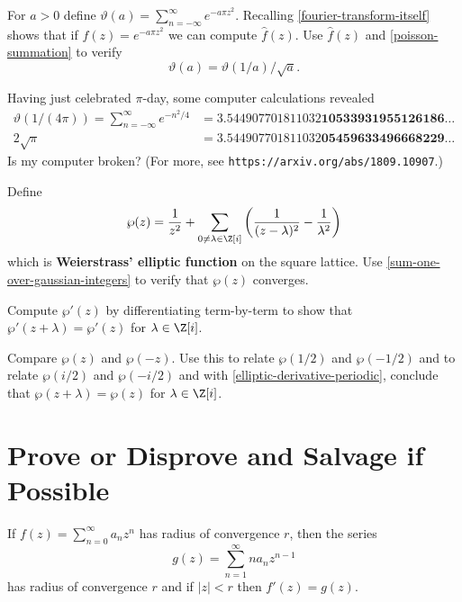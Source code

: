 \documentclass{homework}
\begin{document}
\begin{problem}\label{modularity}For $a > 0$ define
  $\vartheta(a) = \sum_{n=-\infty}^\infty e^{-a \pi z^2}$.  Recalling
  \ref{fourier-transform-itself} shows that if $f(z) = e^{-a \pi z^2}$
  we can compute $\hat{f}(z)$.  Use $\hat{f}(z)$ and
  \ref{poisson-summation} to verify
  \[
    \vartheta(a) = \vartheta(1/a) / \sqrt{a}.
  \]
\end{problem}

\begin{problem}
  Having just celebrated $\pi$-day, some computer calculations revealed
\begin{align*}
  \vartheta(1/(4\pi)) = \sum_{n=-\infty}^\infty e^{-n^2/4} &=
3.544907701811032\textbf{10533931955126186}\ldots \\
  2\sqrt{\pi} &=
3.544907701811032\textbf{05459633496668229}\ldots
\end{align*}
Is my computer broken?  (For more, see \texttt{https://arxiv.org/abs/1809.10907}.)
\end{problem}

\begin{problem}
  Define
  \[
    \wp(z) = \frac{1}{z^2} + \sum_{0 \neq \lambda \in \Z[i]} \left( \frac{1}{(z - \lambda)^2} - \frac{1}{\lambda^2} \right)
  \]
  which is \textbf{Weierstrass' elliptic function} on the square lattice.  Use \ref{sum-one-over-gaussian-integers} to verify that $\wp(z)$ converges.
\end{problem}

\begin{problem}\label{elliptic-derivative-periodic}Compute $\wp'(z)$ by differentiating term-by-term to show that $\wp'(z + \lambda) = \wp'(z)$ for $\lambda \in \Z[i]$.
\end{problem}

\begin{problem}
  Compare $\wp(z)$ and $\wp(-z)$.  Use this to relate $\wp(1/2)$ and $\wp(-1/2)$ and to relate $\wp(i/2)$ and $\wp(-i/2)$ and with \ref{elliptic-derivative-periodic}, conclude that $\wp(z + \lambda) = \wp(z)$ for $\lambda \in \Z[i]$.
\end{problem}

\section{Prove or Disprove and Salvage if Possible}

\begin{problem}\label{differentiating-taylor-series}If
  $f(z) = \sum_{n=0}^\infty a_n z^n$ has radius of convergence $r$,
  then the series
  \[
    g(z) = \sum_{n=1}^\infty n a_n z^{n-1} 
  \]
  has radius of convergence $r$ and if $|z| < r$ then $f'(z) = g(z)$.
\end{problem}
\end{document}
